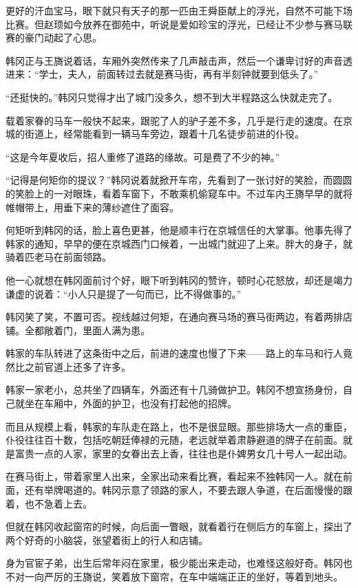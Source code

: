 更好的汗血宝马，眼下就只有天子的那一匹由王舜臣献上的浮光，自然不可能下场比赛。但赵顼如今放养在御苑中，听说是爱如珍宝的浮光，已经让不少参与赛马联赛的豪门动起了心思。

韩冈正与王旖说着话，车厢外突然传来了几声敲击声，然后一个谦卑讨好的声音透进来：“学士，夫人，前面转过去就是赛马街，再有半刻钟就要到低头了。”

“还挺快的。”韩冈只觉得才出了城门没多久，想不到大半程路这么快就走完了。

载着家眷的马车一般快不起来，跟驼了人的驴子差不多，几乎是行走的速度。在京城的街道上，经常能看到一辆马车旁边，跟着十几名徒步前进的仆役。

“这是今年夏收后，招人重修了道路的缘故。可是费了不少的神。”

“记得是何矩你的提议？”韩冈说着就掀开车帘，先看到了一张讨好的笑脸，而圆圆的笑脸上的一对眼珠，看着车窗下，不敢乘机偷窥车中。不过车内王旖早早的就将帷帽带上，用垂下来的薄纱遮住了面容。

何矩听到韩冈的话，脸上喜色更甚，他是顺丰行在京城信任的大掌事。他事先得了韩家的通知，早早的便在京城西门口候着，一出城门就迎了上来。胖大的身子，就骑着匹老马在前面领路。

他一心就想在韩冈面前讨个好，眼下听到韩冈的赞许，顿时心花怒放，却还是竭力谦虚的说着：“小人只是提了一句而已，比不得做事的。”

韩冈笑了笑，不置可否。视线越过何矩，在通向赛马场的赛马街两边，有着两排店铺。全都敞着门，里面人满为患。

韩家的车队转进了这条街中之后，前进的速度也慢了下来——路上的车马和行人竟然比之前官道上还多了许多。

韩家一家老小，总共坐了四辆车，外面还有十几骑做护卫。韩冈不想宣扬身份，自己就坐在车厢中，外面的护卫，也没有打起他的招牌。

而且从规模上看，韩家的车队走在路上，也不是很显眼。那些排场大一点的重臣，仆役往往百十数，包括吃朝廷俸禄的元随，老远就举着肃静避道的牌子在前面。就是富贵一点的人家，家里的女眷出去上香，往往也是仆婢男女几十号人一起出动。

在赛马街上，带着家里人出来，全家出动来看比赛，看起来不独韩冈一人。就在前面，还有举牌喝道的。韩冈示意了领路的家人，不要去跟人争道，在后面慢慢的跟着，也不急着上去。

但就在韩冈收起窗帘的时候，向后面一瞥眼，就看着行在侧后方的车窗上，探出了两个好奇的小脑袋，张望着街上的行人和店铺。

身为官宦子弟，出生后常年闷在家里，极少能出来走动，也难怪这般好奇。韩冈也不对一向严厉的王旖说，笑着放下窗帘，在车中端端正正的坐好，等着到地头。

